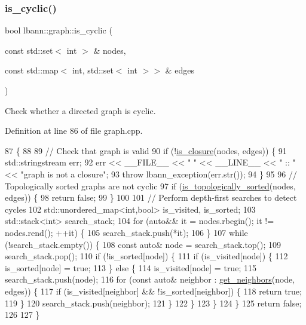 \subsubsection{\texorpdfstring{is\+\_\+cyclic()}{is\_cyclic()}}
{\footnotesize\ttfamily bool lbann\+::graph\+::is\+\_\+cyclic (\begin{DoxyParamCaption}\item[{const std\+::set$<$ int $>$ \&}]{nodes,  }\item[{const std\+::map$<$ int, std\+::set$<$ int $>$$>$ \&}]{edges }\end{DoxyParamCaption})}

Check whether a directed graph is cyclic. 

Definition at line 86 of file graph.\+cpp.


\begin{DoxyCode}
87                                                      \{
88 
89   \textcolor{comment}{// Check that graph is valid}
90   \textcolor{keywordflow}{if} (!\hyperlink{namespacelbann_1_1graph_ac9c1819b38f8bc514ab24ac8778f840b}{is\_closure}(nodes, edges)) \{
91     std::stringstream err;
92     err << \_\_FILE\_\_ << \textcolor{stringliteral}{" "} << \_\_LINE\_\_ << \textcolor{stringliteral}{" :: "} << \textcolor{stringliteral}{"graph is not a closure"};
93     \textcolor{keywordflow}{throw} lbann\_exception(err.str());
94   \}
95 
96   \textcolor{comment}{// Topologically sorted graphs are not cyclic}
97   \textcolor{keywordflow}{if} (\hyperlink{namespacelbann_1_1graph_a0dd9dcef8bc13481677692347530e328}{is\_topologically\_sorted}(nodes, edges)) \{
98     \textcolor{keywordflow}{return} \textcolor{keyword}{false};
99   \}
100 
101   \textcolor{comment}{// Perform depth-first searches to detect cycles}
102   std::unordered\_map<int,bool> is\_visited, is\_sorted;
103   std::stack<int> search\_stack;
104   \textcolor{keywordflow}{for} (\textcolor{keyword}{auto}&& it = nodes.rbegin(); it != nodes.rend(); ++it) \{
105     search\_stack.push(*it);
106   \}
107   \textcolor{keywordflow}{while} (!search\_stack.empty()) \{
108     \textcolor{keyword}{const} \textcolor{keyword}{auto}& node = search\_stack.top();
109     search\_stack.pop();
110     \textcolor{keywordflow}{if} (!is\_sorted[node]) \{
111       \textcolor{keywordflow}{if} (is\_visited[node]) \{
112         is\_sorted[node] = \textcolor{keyword}{true};
113       \} \textcolor{keywordflow}{else} \{
114         is\_visited[node] = \textcolor{keyword}{true};
115         search\_stack.push(node);
116         \textcolor{keywordflow}{for} (\textcolor{keyword}{const} \textcolor{keyword}{auto}& neighbor : \hyperlink{namespacelbann_1_1graph_ad305e0d104d25d9cb1e63a4b93c0847c}{get\_neighbors}(node, edges)) \{
117           \textcolor{keywordflow}{if} (is\_visited[neighbor] && !is\_sorted[neighbor]) \{
118             \textcolor{keywordflow}{return} \textcolor{keyword}{true};
119           \}
120           search\_stack.push(neighbor);
121         \}
122       \}
123     \}
124   \}
125   \textcolor{keywordflow}{return} \textcolor{keyword}{false};
126   
127 \}
\end{DoxyCode}
